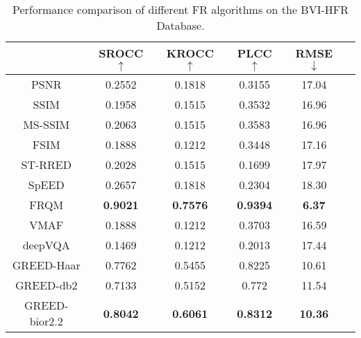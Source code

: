 \documentclass[journal]{IEEEtran}
\begin{document}
\begin{table}[t]
\caption{Performance comparison of different FR algorithms on the BVI-HFR Database.}
\label{table:BVI_HFR}
    \centering
    \begin{tabular}{|c||c|c|c|c|c|}
        \hline
        ~ & SROCC $\uparrow$ & KROCC $\uparrow$ & PLCC $\uparrow$ & RMSE $\downarrow$ \\ \hline \hline
        PSNR & 0.2552 & 0.1818 & 0.3155 & 17.04 \\ 
        SSIM \cite{wang2004image} & 0.1958 & 0.1515 & 0.3532 & 16.96 \\ 
        MS-SSIM \cite{wang2003multiscale} & 0.2063 & 0.1515 & 0.3583 & 16.96 \\ 
        FSIM \cite{zhang2011fsim} & 0.1888 & 0.1212 & 0.3448 & 17.16 \\ 
        ST-RRED \cite{soundararajan2012video} & 0.2028 & 0.1515 & 0.1699 & 17.97 \\
        SpEED \cite{bampis2017speed} & 0.2657 & 0.1818 & 0.2304 & 18.30 \\ 
        FRQM \cite{zhang2017frame} & \textbf{0.9021} & \textbf{0.7576} & \textbf{0.9394} & \textbf{6.37} \\ 
        VMAF \cite{VMAF2016} & 0.1888 & 0.1212 & 0.3703 & 16.59 \\
        deepVQA \cite{kim2018deep} & 0.1469 & 0.1212 & 0.2013 & 17.44 \\ \hline
        GREED-Haar & 0.7762 & 0.5455 & 0.8225 & 10.61 \\
        GREED-db2 & 0.7133 & 0.5152 & 0.772 & 11.54 \\
        GREED-bior2.2 & \textbf{0.8042} & \textbf{0.6061} & \textbf{0.8312} & \textbf{10.36} \\
        \hline
    \end{tabular}
\end{table}
\end{document}
